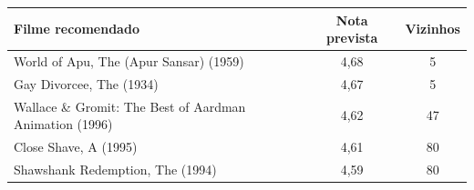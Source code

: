 \begin{tabular}{p{1.95in}cc}
\hline
Filme recomendado & Nota prevista & Vizinhos \\
\hline
World of Apu, The (Apur Sansar) (1959) & 4,68 & 5 \\
Gay Divorcee, The (1934) & 4,67 & 5 \\
Wallace \& Gromit: The Best of Aardman Animation (1996) & 4,62 & 47 \\
Close Shave, A (1995) & 4,61 & 80 \\
Shawshank Redemption, The (1994) & 4,59 & 80 \\
\hline
\end{tabular}

